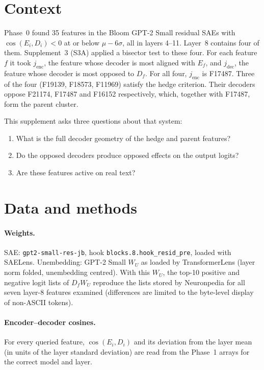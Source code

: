\documentclass[11pt,a4paper]{article}
\newcommand{\cosED}{\cos(E_i, D_i)}
\begin{document}
\section{Context}

Phase~0 found 35 features in the Bloom GPT-2 Small residual SAEs \citep{bloom2024} with $\cosED < 0$ at or below $\mu - 6\sigma$, all in layers 4--11. Layer~8 contains four of them. Supplement~3 (S3A) applied a bisector test to these four. For each feature $f$ it took $j_{\mathrm{enc}}$, the feature whose decoder is most aligned with $E_f$, and $j_{\mathrm{dec}}$, the feature whose decoder is most opposed to $D_f$. For all four, $j_{\mathrm{enc}}$ is F17487. Three of the four (F19139, F18573, F11969) satisfy the hedge criterion. Their decoders oppose F21174, F17487 and F16152 respectively, which, together with F17487, form the parent cluster.

This supplement asks three questions about that system:
\begin{enumerate}[noitemsep]
  \item What is the full decoder geometry of the hedge and parent features?
  \item Do the opposed decoders produce opposed effects on the output logits?
  \item Are these features active on real text?
\end{enumerate}

\section{Data and methods}

\paragraph{Weights.} SAE: \texttt{gpt2-small-res-jb}, hook \nolinkurl{blocks.8.hook_resid_pre}, loaded with SAELens. Unembedding: GPT-2 Small $W_U$ as loaded by TransformerLens (layer norm folded, unembedding centred). With this $W_U$, the top-10 positive and negative logit lists of $D_f W_U$ reproduce the lists stored by Neuronpedia for all seven layer-8 features examined (differences are limited to the byte-level display of non-ASCII tokens).

\paragraph{Encoder--decoder cosines.} For every queried feature, $\cosED$ and its deviation from the layer mean (in units of the layer standard deviation) are read from the Phase~1 arrays for the correct model and layer.
\end{document}
